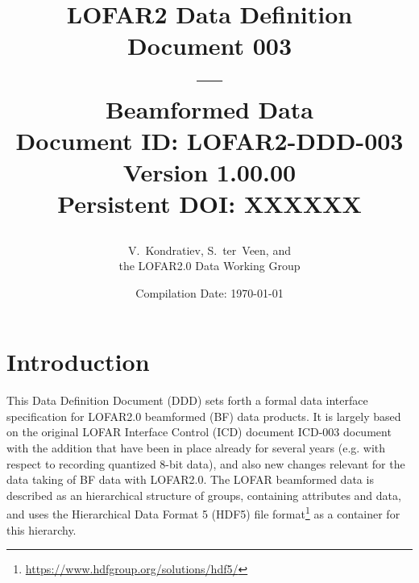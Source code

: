 \documentclass[a4paper,10pt,bibtotoc]{scrartcl}
\begin{document}
\title{LOFAR2 Data Definition Document 003 \\ --- \\ Beamformed Data\\
  {\normalsize Document ID: LOFAR2-DDD-003} \\
  {\normalsize Version 1.00.00} \\
   {\normalsize Persistent DOI: XXXXXX} \\
\author{ \parbox{\linewidth}{\centering V.~Kondratiev, S.~ter~Veen, and \\the LOFAR2.0 Data Working Group} }
\date{\small{Compilation Date: \today}}
}

\maketitle

\tableofcontents

\listoffigures

\listoftables

\clearpage


\clearpage



\clearpage



\section{Introduction}
\label{sec:introduction}

This Data Definition Document (DDD) sets forth a formal data interface specification for
LOFAR2.0 beamformed (BF) data products. It is largely based on the original LOFAR Interface Control (ICD) document ICD-003 document~\cite{lofar.icd.003} with the addition
that have been in place already for several years (e.g. with respect to recording quantized 8-bit data), and also new changes relevant for
the data taking of BF data with LOFAR2.0. The LOFAR beamformed data is described as an hierarchical
structure of groups, containing attributes and data, and uses the Hierarchical Data Format 5 (HDF5)
file format\footnote{\url{https://www.hdfgroup.org/solutions/hdf5/}} as a container for this hierarchy.
\end{document}
